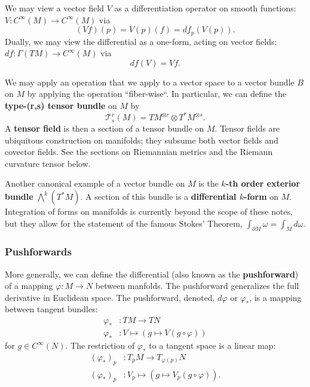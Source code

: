 \documentclass[reqno]{amsart}
\numberwithin{equation}{section}
\begin{document}
We may view a vector field $V$ as a differentiation operator on smooth functions: $V : C^{\infty}(M) \to C^{\infty}(M)$
via
$$
    (Vf)(p) = V(p)(f) = df_p(V(p)).
$$
Dually, we may view the differential as a one-form, acting on vector fields: $df : \Gamma(TM) \to C^{\infty}(M)$ via
$$
    df(V) = Vf.
$$

We may apply an operation that we apply to a vector space to a vector bundle $B$ on $M$ by
applying the operation ``fiber-wise``. In particular, we can define the \textbf{type-(r,s) tensor bundle} on $M$ by
$$
    \mathcal T^r_s(M) = TM^{\otimes r} \otimes T^*M^{\otimes s}.
$$
A \textbf{tensor field} is then a section of a tensor bundle on $M$. Tensor fields are ubiquitous construction on
manifolds; they subsume both vector fields and covector fields. See the sections on Riemannian metrics and
the Riemann curvature tensor below.

Another canonical example of a vector bundle on $M$ is the \textbf{$k$-th order exterior bundle}
$\bigwedge^k(T^*M)$. A section of this bundle is a \textbf{differential $k$-form} on $M$. Integration of forms on
manifolds is currently beyond the scope of these notes, but they allow for the statement of the famous
Stokes' Theorem, $\int_{\partial M} \omega = \int_M d\omega$.

\subsubsection{Pushforwards}

More generally, we can define the differential (also known as the \textbf{pushforward}) of a mapping
$\varphi : M \to N$ between manfolds. The pushforward generalizes the full derivative in Euclidean space.
The pushforward, denoted, $d\varphi$ or $\varphi_*$, is a mapping between
tangent bundles:
\begin{align*}
    \varphi_* &: TM \to TN \\
    \varphi_* &: V \mapsto (g \mapsto V(g \circ \varphi))
\end{align*}
for $g \in C^{\infty}(N)$. The restriction of $\varphi_*$ to a tangent space is a linear map:
\begin{align*}
    (\varphi_*)_p &: T_pM \to T_{\varphi(p)}N \\
    (\varphi_*)_p &: V_p \mapsto (g \mapsto V_p (g \circ \varphi)).
\end{align*}
\end{document}
